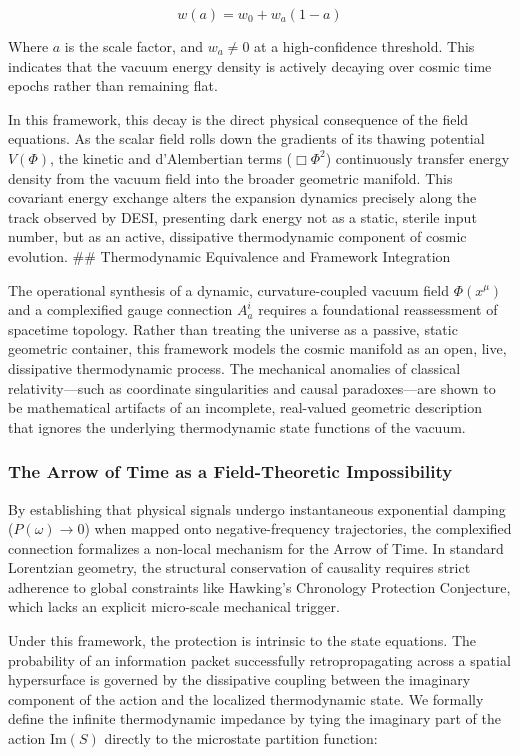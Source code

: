 \[w(a) = w_0 + w_a(1-a)\]

Where \(a\) is the scale factor, and \(w_a \neq 0\) at a high-confidence
threshold. This indicates that the vacuum energy density is actively
decaying over cosmic time epochs rather than remaining flat.

In this framework, this decay is the direct physical consequence of the
field equations. As the scalar field rolls down the gradients of its
thawing potential \(V(\Phi)\), the kinetic and d'Alembertian terms
(\(\Box\Phi^2\)) continuously transfer energy density from the vacuum
field into the broader geometric manifold. This covariant energy
exchange alters the expansion dynamics precisely along the track
observed by DESI, presenting dark energy not as a static, sterile input
number, but as an active, dissipative thermodynamic component of cosmic
evolution. \#\# Thermodynamic Equivalence and Framework Integration

The operational synthesis of a dynamic, curvature-coupled vacuum field
\(\Phi(x^\mu)\) and a complexified gauge connection \(A_a^i\) requires a
foundational reassessment of spacetime topology. Rather than treating
the universe as a passive, static geometric container, this framework
models the cosmic manifold as an open, live, dissipative thermodynamic
process. The mechanical anomalies of classical relativity---such as
coordinate singularities and causal paradoxes---are shown to be
mathematical artifacts of an incomplete, real-valued geometric
description that ignores the underlying thermodynamic state functions of
the vacuum.

\subsubsection{The Arrow of Time as a Field-Theoretic
Impossibility}\label{the-arrow-of-time-as-a-field-theoretic-impossibility}

By establishing that physical signals undergo instantaneous exponential
damping (\(P(\omega) \to 0\)) when mapped onto negative-frequency
trajectories, the complexified connection formalizes a non-local
mechanism for the Arrow of Time. In standard Lorentzian geometry, the
structural conservation of causality requires strict adherence to global
constraints like Hawking's Chronology Protection Conjecture, which lacks
an explicit micro-scale mechanical trigger.

Under this framework, the protection is intrinsic to the state
equations. The probability of an information packet successfully
retropropagating across a spatial hypersurface is governed by the
dissipative coupling between the imaginary component of the action and
the localized thermodynamic state. We formally define the infinite
thermodynamic impedance by tying the imaginary part of the action
\(\text{Im}(S)\) directly to the microstate partition function:

